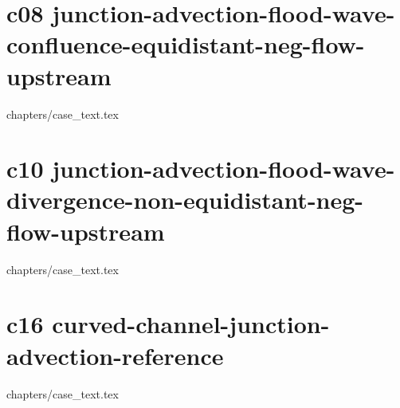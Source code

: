 \chapter{c08 junction-advection-flood-wave-confluence-equidistant-neg-flow-upstream}
\graphicspath{{../c08_junction-advection-flood-wave-confluence-equidistant-neg-flow-upstream/doc/}}
{chapters/case_text.tex}
%
\chapter{c10 junction-advection-flood-wave-divergence-non-equidistant-neg-flow-upstream}
\graphicspath{{../c10_junction-advection-flood-wave-divergence-non-equidistant-neg-flow-upstream/doc/}}
{chapters/case_text.tex}
%
\chapter{c16 curved-channel-junction-advection-reference}
\graphicspath{{../c16_curved-channel-junction-advection-reference/doc/}}
{chapters/case_text.tex}
%
